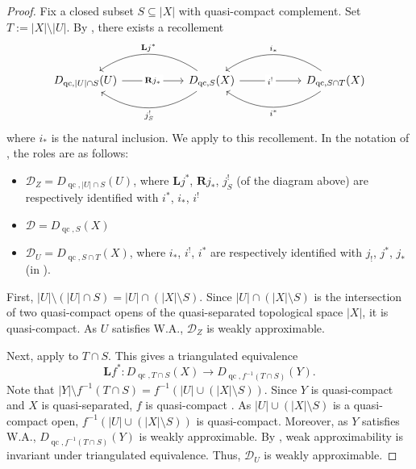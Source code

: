 \documentclass[11pt]{amsart}
\theoremstyle{plain}
\theoremstyle{definition}
\numberwithin{equation}{section}
\numberwithin{theorem}{section}
\begin{document}
\begin{proof}
    Fix a closed subset $S\subseteq |X|$ with quasi-compact complement.
    Set $T := |X|\setminus |U|$.
    By \cite[Lemma A.4]{GuisadoVillaalgordo/Lank:2026}, there exists a recollement
    \begin{displaymath}
        \begin{tikzcd}[column sep=5.5em]
            {D_{\operatorname{qc},|U|\cap S}(U)} & {D_{\operatorname{qc},S}(X)} & {D_{\operatorname{qc},S\cap T}(X)}
            \arrow["{\mathbf{R}j_\ast}" description, from=1-1, to=1-2]
            \arrow["{\mathbf{L}j^\ast}"', bend right=35, from=1-2, to=1-1]
            \arrow["{j^!_S}", bend left=35, from=1-2, to=1-1]
            \arrow["{i^!}" description, from=1-2, to=1-3]
            \arrow["{i_\ast}"', bend right=35, from=1-3, to=1-2]
            \arrow["{i^\ast}", bend left=35, from=1-3, to=1-2]
        \end{tikzcd}
    \end{displaymath}
    where $i_\ast$ is the natural inclusion.
    We apply  to this recollement.
    In the notation of , the roles are as follows:
    \begin{itemize}
        \item $\mathcal{D}_Z = D_{\operatorname{qc},|U|\cap S}(U)$, where $\mathbf{L}j^\ast$, $\mathbf{R}j_\ast$, $j^!_S$ (of the diagram above) are respectively identified with $i^\ast$, $i_\ast$, $i^!$
        \item $\mathcal{D} = D_{\operatorname{qc},S}(X)$
        \item $\mathcal{D}_U = D_{\operatorname{qc},S\cap T}(X)$, where $i_\ast$, $i^!$, $i^\ast$ are respectively identified with $j_!$, $j^\ast$, $j_\ast$ (in ).
    \end{itemize}

    First, $|U|\setminus (|U|\cap S) = |U|\cap (|X|\setminus S)$.
    Since $|U|\cap (|X|\setminus S)$ is the intersection of two quasi-compact opens of the quasi-separated topological space $|X|$, it is quasi-compact.
    As $U$ satisfies W.A., $\mathcal{D}_Z$ is weakly approximable.

    Next, apply \cite[Lemma A.6]{GuisadoVillaalgordo/Lank:2026} to $T\cap S$.
    This gives a triangulated equivalence
    \begin{displaymath}
        \mathbf{L}f^\ast\colon D_{\operatorname{qc},T\cap S}(X)\to D_{\operatorname{qc},f^{-1}(T\cap S)}(Y).
    \end{displaymath}
    Note that $|Y|\setminus f^{-1}(T\cap S) = f^{-1}(|U|\cup (|X|\setminus S))$.
    Since $Y$ is quasi-compact and $X$ is quasi-separated, $f$ is quasi-compact \cite[\href{https://stacks.math.columbia.edu/tag/073B}{Tag 073B}]{StacksProject}.
    As $|U|\cup (|X|\setminus S)$ is a quasi-compact open, $f^{-1}(|U|\cup (|X|\setminus S))$ is quasi-compact.
    Moreover, as $Y$ satisfies W.A., $D_{\operatorname{qc},f^{-1}(T\cap S)}(Y)$ is weakly approximable.
    By \cite[Remark 3.4(i)]{Canonaco/Neeman/Stellari:2024}, weak approximability is invariant under triangulated equivalence.
    Thus, $\mathcal{D}_U$ is weakly approximable.


\end{proof}
\end{document}
